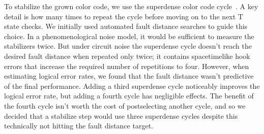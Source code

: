 \documentclass[onecolumn,unpublished,a4paper]{quantumarticle}
\theoremstyle{definition}
\begin{document}
To stabilize the grown color code, we use the superdense color code cycle~\cite{gidney2023colorcode}.
A key detail is how many times to repeat the cycle before moving on to the next T state checks.
We initially used automated fault distance searches to guide this choice.
In a phenomenological noise model, it would be sufficient to measure the stabilizers twice.
But under circuit noise the superdense cycle doesn't reach the desired fault distance when repeated only twice; it contains spacetimelike hook errors that increase the required number of repetitions to four.
However, when estimating logical error rates, we found that the fault distance wasn't predictive of the final performance.
Adding a third superdense cycle noticeably improves the logical error rate, but adding a fourth cycle has negligible effects.
The benefit of the fourth cycle isn't worth the cost of postselecting another cycle, and so we decided that a stabilize step would use three superdense cycles despite this technically not hitting the fault distance target.
\end{document}
